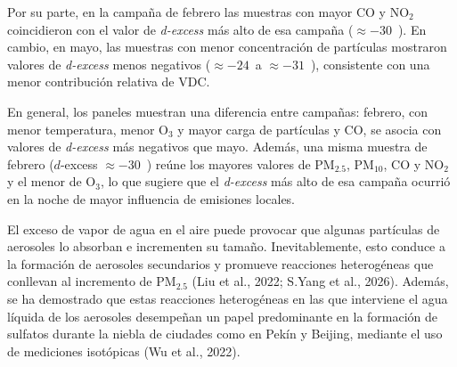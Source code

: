 
Por su parte, en la campaña de febrero las muestras con mayor CO y 
NO$_2$ coincidieron con el valor de \textit{d-excess} más alto de esa campaña 
($\approx -30$~\textperthousand). En cambio, en mayo, las muestras con menor concentración 
de partículas mostraron valores de  \textit{d-excess} menos negativos
($\approx -24$~\textperthousand a $\approx -31$~\textperthousand), consistente con
una menor contribución relativa de VDC. 

En general, los paneles muestran una diferencia entre campañas: 
febrero, con menor temperatura, menor O$_3$ y mayor carga de partículas y CO, 
se asocia con valores de \textit{d-excess} más negativos que mayo. Además, una misma 
muestra de febrero ($d$\nobreakdash-excess $\approx -30$~\textperthousand) reúne
los mayores valores de PM$_{2.5}$, PM$_{10}$, CO y NO$_2$ y el menor de O$_3$, 
lo que sugiere que el \textit{d-excess} más alto de esa campaña ocurrió en la noche de 
mayor influencia de emisiones locales. 

El exceso de vapor de agua en el aire puede 
provocar que algunas partículas de aerosoles lo absorban e incrementen su tamaño. 
Inevitablemente, esto conduce a la formación de aerosoles secundarios y 
promueve reacciones heterogéneas que conllevan al incremento de PM$_{2.5}$ 
(Liu et al., 2022; S.Yang et al., 2026). Además, se 
ha demostrado que estas reacciones heterogéneas en las que interviene el agua líquida 
de los aerosoles desempeñan un papel predominante en la formación de sulfatos durante 
la niebla de ciudades como en Pekín y Beijing, mediante el uso de mediciones isotópicas 
(Wu et al., 2022). 







